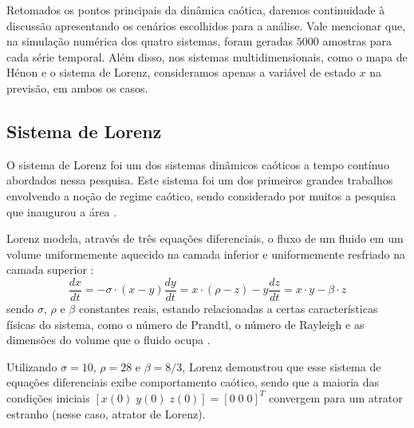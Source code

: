 \documentclass[a4paper, 12pt]{article}
\begin{document}
Retomados os pontos principais da dinâmica caótica, daremos continuidade à discussão apresentando os cenários escolhidos para a análise. Vale mencionar que, na simulação numérica dos quatro sistemas, foram geradas $5000$ amostras para cada série temporal. Além disso, nos sistemas multidimensionais, como o mapa de Hénon e o sistema de Lorenz, consideramos apenas a variável de estado $x$ na previsão, em ambos os casos.

\subsection{Sistema de Lorenz}

O sistema de Lorenz foi um dos sistemas dinâmicos caóticos a tempo contínuo abordados nessa pesquisa. Este sistema foi um dos primeiros grandes trabalhos envolvendo a noção de regime caótico, sendo considerado por muitos a pesquisa que inaugurou a área \cite{gleick1998chaos}.

Lorenz modela, através de três equações diferenciais, o fluxo de um fluido em um volume uniformemente aquecido na camada inferior e uniformemente resfriado na camada superior \cite{lorenz1963deterministic}:
\begin{subequations}
\begin{equation}
\frac{dx}{dt} = -\sigma \cdot (x - y)
\end{equation}
\begin{equation}
\frac{dy}{dt} = x \cdot (\rho - z) - y
\end{equation}
\begin{equation}
\frac{dz}{dt} = x \cdot y - \beta \cdot z
\end{equation}
\end{subequations}
sendo $\sigma$, $\rho$ e $\beta$ constantes reais, estando relacionadas a certas características físicas do sistema, como o número de Prandtl, o número de Rayleigh e as dimensões do volume que o fluido ocupa \cite{fiedler1994caos}.

Utilizando $\sigma = 10$, $\rho = 28$ e $\beta = 8/3$, Lorenz demonstrou que esse sistema de equações diferenciais exibe comportamento caótico, sendo que a maioria das condições iniciais $[x(0)\; y(0)\; z(0)] = [0\; 0\; 0]^T$ convergem para um atrator estranho (nesse caso, atrator de Lorenz).
\end{document}
